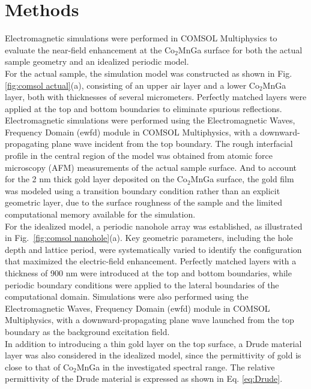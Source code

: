 \documentclass[journal]{IEEEtran}
\begin{document}
\section{Methods}
\indent
Electromagnetic simulations were performed in COMSOL Multiphysics to evaluate the near-field enhancement at the Co$_2$MnGa surface for both the actual sample geometry and an idealized periodic model.\\
\indent
For the actual sample, the simulation model was constructed as shown in Fig. \ref{fig:comsol actual}(a), consisting of an upper air layer and a lower Co$_2$MnGa layer, both with thicknesses of several micrometers. Perfectly matched layers were applied at the top and bottom boundaries to eliminate spurious reflections. Electromagnetic simulations were performed using the Electromagnetic Waves, Frequency Domain (ewfd) module in COMSOL Multiphysics, with a downward-propagating plane wave incident from the top boundary. The rough interfacial profile in the central region of the model was obtained from atomic force microscopy (AFM) measurements of the actual sample surface. And to account for the 2 nm thick gold layer deposited on the Co$_2$MnGa surface, the gold film was modeled using a transition boundary condition rather than an explicit geometric layer, due to the surface roughness of the sample and the limited computational memory available for the simulation.\\
\indent
For the idealized model, a periodic nanohole array was established, as illustrated in Fig.~\ref{fig:comsol nanohole}(a). Key geometric parameters, including the hole depth and lattice period, were systematically varied to identify the configuration that maximized the electric-field enhancement. Perfectly matched layers with a thickness of 900 nm were introduced at the top and bottom boundaries, while periodic boundary conditions were applied to the lateral boundaries of the computational domain. Simulations were also performed using the Electromagnetic Waves, Frequency Domain (ewfd) module in COMSOL Multiphysics, with a downward-propagating plane wave launched from the top boundary as the background excitation field.\\
\indent
In addition to introducing a thin gold layer on the top surface, a Drude material layer was also considered in the idealized model, since the permittivity of gold is close to that of Co$_2$MnGa in the investigated spectral range. The relative permittivity of the Drude material is expressed as shown in Eq. \ref{eq:Drude}.\\
\end{document}
